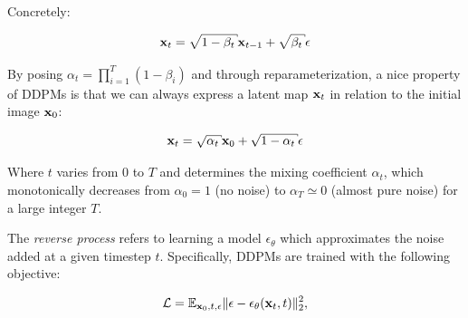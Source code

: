 Concretely:

\begin{equation}
      \x_t = \sqrt{1 - \beta_t} \x_{t-1} +  \sqrt{\beta_t} \epsilon
\end{equation}

By posing $\alpha_t = \prod_{i=1}^{T} (1 - \beta_i)$ and through reparameterization, 
a nice property of \ac{DDPM}s is that we can always express a latent map $\mathbf{x}_t$ in relation 
to the initial image $\mathbf{x}_0$:

\begin{equation}
      \x_t = \sqrt{\alpha_t} \x_0 +  \sqrt{1 - \alpha_t} \epsilon
\end{equation}

Where $t$ varies from $0$ to $T$ and determines the mixing coefficient $\alpha_t$, which monotonically 
decreases from  $\alpha_0 = 1$ (no noise) to $\alpha_T \simeq 0$ (almost pure noise) for a large integer $T$.


The \emph{reverse process} refers to learning a model  $\epsilon_\theta$  which approximates the noise added at a given 
timestep $t$. Specifically, \ac{DDPM}s are trained with the following objective:

\begin{equation}
      \mathcal{L} = \displaystyle \mathbb{E}_{\mathbf{x}_0, t, \epsilon} \Vert \epsilon - \epsilon_\theta(\mathbf{x}_t, t) \Vert_2^2,
\end{equation}











